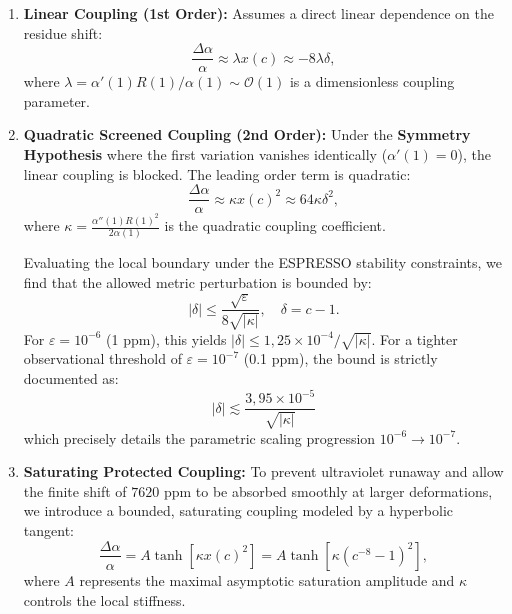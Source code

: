 \documentclass[11pt,a4paper]{article}
\theoremstyle{definition}
\begin{document}
	\begin{enumerate}
		\item \textbf{Linear Coupling (1st Order):} Assumes a direct linear dependence on the residue shift:
		\begin{equation}
			\frac{\Delta\alpha}{\alpha} \approx \lambda x(c) \approx -8\lambda\delta,
		\end{equation}
		where $\lambda = \alpha'(1)R(1)/\alpha(1) \sim \mathcal{O}(1)$ is a dimensionless coupling parameter.
		
		\item \textbf{Quadratic Screened Coupling (2nd Order):} Under the \textbf{Symmetry Hypothesis} where the first variation vanishes identically ($\alpha'(1) = 0$), the linear coupling is blocked. The leading order term is quadratic:
		\begin{equation}
			\frac{\Delta\alpha}{\alpha} \approx \kappa x(c)^2 \approx 64\kappa\delta^2,
		\end{equation}
		where $\kappa = \frac{\alpha''(1)R(1)^2}{2\alpha(1)}$ is the quadratic coupling coefficient.
		
		Evaluating the local boundary under the ESPRESSO stability constraints, we find that the allowed metric perturbation is bounded by:
		\begin{equation}
			|\delta| \le \frac{\sqrt{\varepsilon}}{8\sqrt{|\kappa|}}, \quad \delta = c - 1.
		\end{equation}
		For $\varepsilon = 10^{-6}$ (1 ppm), this yields $|\delta| \le 1{,}25 \times 10^{-4} / \sqrt{|\kappa|}$. For a tighter observational threshold of $\varepsilon = 10^{-7}$ (0.1 ppm), the bound is strictly documented as:
		\begin{equation}
			\boxed{ |\delta| \lesssim \frac{3{,}95 \times 10^{-5}}{\sqrt{|\kappa|}} }
		\end{equation}
		which precisely details the parametric scaling progression $10^{-6} \to 10^{-7}$.
		
		\item \textbf{Saturating Protected Coupling:} To prevent ultraviolet runaway and allow the finite shift of $7620$ ppm to be absorbed smoothly at larger deformations, we introduce a bounded, saturating coupling modeled by a hyperbolic tangent:
		\begin{equation}
			\frac{\Delta\alpha}{\alpha} = A \tanh\left[\kappa x(c)^2\right] = A \tanh\left[\kappa (c^{-8}-1)^2\right],
		\end{equation}
		where $A$ represents the maximal asymptotic saturation amplitude and $\kappa$ controls the local stiffness.
		

\end{enumerate}
\end{document}
